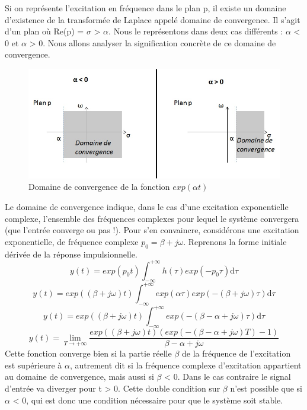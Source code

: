 \documentclass[]{report}
\newcommand{\deriv}{\mathrm{d}}
\begin{document}
	Si on représente l'excitation en fréquence dans le plan p, il existe un
	domaine d'existence de la transformée de Laplace appelé domaine de
	convergence. Il s'agit d'un plan où Re(p) = $\sigma $ \textgreater{} $\alpha $. Nous le
	représentons dans deux cas différents :  $\alpha $ \textless{} 0 et  $\alpha $
	\textgreater{} 0. Nous allons analyser la signification concrète de ce
	domaine de convergence.
	\begin{figure}[h!]
		\centering
		\includegraphics[scale=0.8]{images/Domaine_convergence_exp_at.jpg}
		\caption{Domaine de convergence de la fonction $exp(\alpha t)$}	
		\label{Fig:Domaine_convergence_exp_at} 
	\end{figure}
	Le domaine de convergence indique, dans le cas d'une excitation
	exponentielle complexe, l'ensemble des fréquences complexes pour lequel
	le système convergera (que l'entrée converge ou pas !). Pour s'en
	convaincre, considérons une excitation exponentielle, de fréquence
	complexe $p_{0} =  \beta +j \omega $. Reprenons la forme initiale dérivée de la réponse	impulsionnelle.
	\begin{equation*}
	y(t) = exp(p_{0}t)\int_{-\infty}^{+\infty}h(\tau)exp(-p_{0}\tau) \deriv \tau 
	\end{equation*}
	\begin{equation*}
	y(t) = exp((\beta+j\omega)t)\int_{-\infty}^{+\infty}exp(\alpha \tau)exp(-(\beta+j\omega)\tau) \deriv \tau 
	\end{equation*}
	\begin{equation*}
	y(t) = exp((\beta+j\omega)t)\int_{-\infty}^{+\infty}exp(-(\beta-\alpha+j\omega)\tau) \deriv \tau 
	\end{equation*}
	\begin{equation}
	y(t) = \lim_{T \to +\infty} \frac{exp((\beta+j\omega)t)(exp(-(\beta-\alpha+j\omega)T)-1)}{\beta-\alpha+j\omega} 
	\end{equation}
	Cette fonction converge bien si la partie réelle $\beta $ de la fréquence de
	l'excitation est supérieure à  $\alpha $, autrement dit si la fréquence complexe
	d'excitation appartient au domaine de convergence, mais aussi si $\beta $
	\textless{} 0. Dans le cas contraire le signal d'entrée va diverger pour
	t \textgreater{} 0. Cette double condition sur $\beta $ n'est possible que si $\alpha $
	\textless{} 0, qui est donc une condition nécessaire pour que le système
	soit stable.
	
\end{document}
